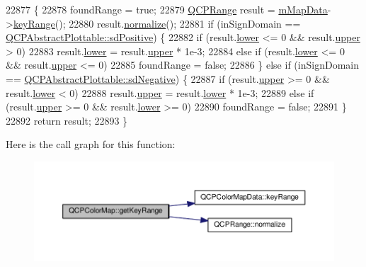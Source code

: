 \begin{DoxyCode}
22877                                                                  \{
22878   foundRange = \textcolor{keyword}{true};
22879   \hyperlink{class_q_c_p_range}{QCPRange} result = \hyperlink{class_q_c_p_color_map_a8709272aa8f0be3ca111bf3866806f8b}{mMapData}->\hyperlink{class_q_c_p_color_map_data_a4765180639742460f64ab6c97c745c08}{keyRange}();
22880   result.\hyperlink{class_q_c_p_range_af914a7740269b0604d0827c634a878a9}{normalize}();
22881   \textcolor{keywordflow}{if} (inSignDomain == \hyperlink{class_q_c_p_abstract_plottable_a661743478a1d3c09d28ec2711d7653d8a02951859f243a4d24e779cfbb5471030}{QCPAbstractPlottable::sdPositive}) \{
22882     \textcolor{keywordflow}{if} (result.\hyperlink{class_q_c_p_range_aa3aca3edb14f7ca0c85d912647b91745}{lower} <= 0 && result.\hyperlink{class_q_c_p_range_ae44eb3aafe1d0e2ed34b499b6d2e074f}{upper} > 0)
22883       result.\hyperlink{class_q_c_p_range_aa3aca3edb14f7ca0c85d912647b91745}{lower} = result.\hyperlink{class_q_c_p_range_ae44eb3aafe1d0e2ed34b499b6d2e074f}{upper} * 1e-3;
22884     \textcolor{keywordflow}{else} \textcolor{keywordflow}{if} (result.\hyperlink{class_q_c_p_range_aa3aca3edb14f7ca0c85d912647b91745}{lower} <= 0 && result.\hyperlink{class_q_c_p_range_ae44eb3aafe1d0e2ed34b499b6d2e074f}{upper} <= 0)
22885       foundRange = \textcolor{keyword}{false};
22886   \} \textcolor{keywordflow}{else} \textcolor{keywordflow}{if} (inSignDomain == \hyperlink{class_q_c_p_abstract_plottable_a661743478a1d3c09d28ec2711d7653d8a0fc9a70796ef60ad18ddd18056e6dc63}{QCPAbstractPlottable::sdNegative}) \{
22887     \textcolor{keywordflow}{if} (result.\hyperlink{class_q_c_p_range_ae44eb3aafe1d0e2ed34b499b6d2e074f}{upper} >= 0 && result.\hyperlink{class_q_c_p_range_aa3aca3edb14f7ca0c85d912647b91745}{lower} < 0)
22888       result.\hyperlink{class_q_c_p_range_ae44eb3aafe1d0e2ed34b499b6d2e074f}{upper} = result.\hyperlink{class_q_c_p_range_aa3aca3edb14f7ca0c85d912647b91745}{lower} * 1e-3;
22889     \textcolor{keywordflow}{else} \textcolor{keywordflow}{if} (result.\hyperlink{class_q_c_p_range_ae44eb3aafe1d0e2ed34b499b6d2e074f}{upper} >= 0 && result.\hyperlink{class_q_c_p_range_aa3aca3edb14f7ca0c85d912647b91745}{lower} >= 0)
22890       foundRange = \textcolor{keyword}{false};
22891   \}
22892   \textcolor{keywordflow}{return} result;
22893 \}
\end{DoxyCode}


Here is the call graph for this function\+:\nopagebreak
\begin{figure}[H]
\begin{center}
\leavevmode
\includegraphics[width=350pt]{class_q_c_p_color_map_a0d89371f8707f12e22737b863f1a5126_cgraph}
\end{center}
\end{figure}


